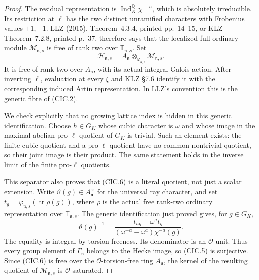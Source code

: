 \begin{proof}
The residual representation is
$\operatorname{Ind}_K^{\mathbb Q}\overline\chi^{\,-a}$,
which is absolutely irreducible.  Its restriction at
$\ell$ has the two distinct unramified characters with
Frobenius values $+1,-1$.  LLZ (2015), Theorem~4.3.4,
printed pp.~14--15, or KLZ Theorem~7.2.8, printed p.~37,
therefore says that the localized full ordinary module
$\mathcal M_{\mathfrak n,s}$ is free of rank two over
$\mathbb T_{\mathfrak n,s}$.  Set
\[
 \mathcal H_{\mathfrak n,s}
       =A_{\mathfrak n}\otimes_{\varphi_{\mathfrak n,s}}
                       \mathcal M_{\mathfrak n,s}.
                                                        \tag{CIC.6}
\]
It is free of rank two over $A_{\mathfrak n}$, with its
actual integral Galois action.  After inverting $\ell$,
evaluation at every $\xi$ and KLZ \S7.6 identify it with
the corresponding induced Artin representation.  In LLZ's
convention this is the generic fibre of (CIC.2).

We check explicitly that no growing lattice index is hidden
in this generic identification.  Choose $h\in G_K$ whose
cubic character is $\omega$ and whose image in the maximal
abelian pro-$\ell$ quotient of $G_K$ is trivial.
Such an element exists: the finite cubic quotient and a
pro-$\ell$ quotient have no common nontrivial quotient,
so their joint image is their product.  The same statement
holds in the inverse limit of the finite pro-$\ell$
quotients.

This separator also proves that (CIC.6) is a literal
quotient, not just a scalar extension.  Write
$\vartheta(g)\in A_{\mathfrak n}^\times$ for the
universal ray character, and set
$t_g=\varphi_{\mathfrak n,s}(\operatorname{tr}\rho(g))$,
where $\rho$ is the actual free rank-two ordinary
representation over $\mathbb T_{\mathfrak n,s}$.
The generic identification just proved gives, for
$g\in G_K$,
\[
 \vartheta(g)^{-1}
  =\frac{t_{hg}-\omega^a t_g}
       {(\omega^{-a}-\omega^a)\chi^{-a}(g)}.             \tag{CIC.6a}
\]
The equality is integral by torsion-freeness.  Its
denominator is an $\mathcal O$-unit.  Thus every group
element of $\Gamma_{\mathfrak n}$ belongs to the Hecke
image, so (CIC.5) is surjective.  Since (CIC.6) is free
over the $\mathcal O$-torsion-free ring $A_{\mathfrak n}$,
the kernel of the resulting quotient of
$\mathcal M_{\mathfrak n,s}$ is $\mathcal O$-saturated.


\end{proof}
